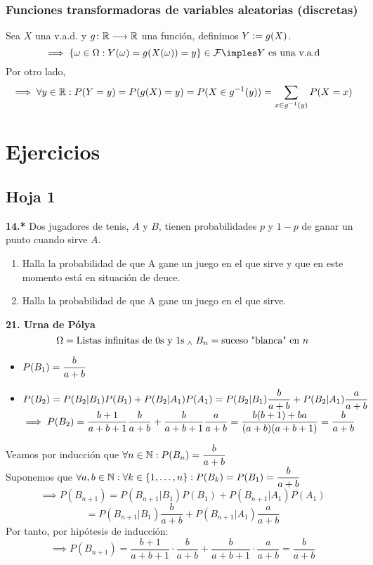 \subsubsection{Funciones transformadoras de variables aleatorias (discretas)}
Sea $X$ una v.a.d. y $g \colon \mathbb{R} \longrightarrow \mathbb{R}$ una función, definimos $Y\vcentcolon= g(X)$.
\[\implies \{\omega \in\Omega:Y(\omega)=g(X(\omega))=y\} \in \F \imples Y\tex{ es una v.a.d}\]
Por otro lado, 
\[\implies \forall y \in \mathbb{R}:P(Y=y)=P(g(X)=y)=P(X\in g^{-1}(y))=\sum_{x\in g^{-1}(y)}P(X=x)\]


\section{Ejercicios}
\subsection{Hoja 1}

\noindent \textbf{14.*} Dos jugadores de tenis, $A$ y $B$, tienen probabilidades $p$ y $1-p$ de ganar un punto cuando sirve $A$.
\begin{enumerate}
    \item Halla la probabilidad de que A gane un juego en el que sirve y que en este momento está en situación de deuce.
    \item Halla la probabilidad de que A gane un juego en el que sirve.
\end{enumerate}

\noindent \textbf{21. Urna de Pólya}
\[\Omega= \text{Listas infinitas de $0$s y $1$s} \; _{\wedge} \; B_n=\text{suceso "blanca" en }n\]
\begin{itemize}%
    \item $\displaystyle P(B_1)=\frac{b}{a+b}$
    \item $\displaystyle P(B_2)=P(B_2|B_1)P(B_1)+P(B_2|A_1)P(A_1)=P(B_2|B_1)\frac{b}{a+b}+P(B_2|A_1)\frac{a}{a+b}$ \\
    $\displaystyle \implies P(B_2)=\frac{b+1}{a+b+1}\frac{b}{a+b}+\frac{b}{a+b+1}\frac{a}{a+b}=\frac{b(b+1)+ba}{(a+b)(a+b+1)}=\frac{b}{a+b}$
\end{itemize}
\begin{dem}
    Veamos por inducción que $\displaystyle \forall n \in \mathbb{N} :P(B_n)=\frac{b}{a+b}$ \\
    Suponemos que $\displaystyle \forall a,b \in \mathbb{N}: \forall k \in \{1, \dots, n\}:P(B_k)=P(B_1)=\frac{b}{a+b}$
    \[\implies P(B_{n+1})=P(B_{n+1}|B_1)P(B_1)+P(B_{n+1}|A_1)P(A_1)\]
    \[=P(B_{n+1}|B_1)\frac{b}{a+b}+P(B_{n+1}|A_1)\frac{a}{a+b}\]
    Por tanto, por hipótesis de inducción:
    \[\implies P(B_{n+1})=\frac{b+1}{a+b+1}\cdot\frac{b}{a+b} + \frac{b}{a+b+1}\cdot\frac{a}{a+b}=\frac{b}{a+b}\]
\end{dem}





